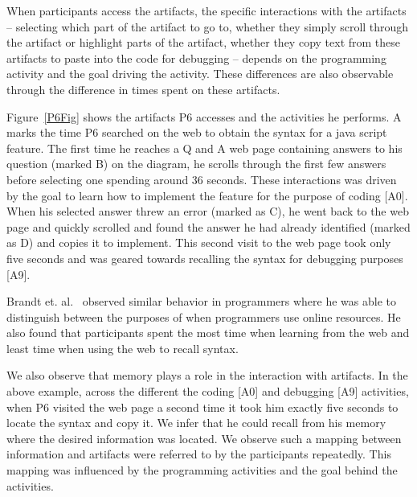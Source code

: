 When participants access the artifacts, the specific interactions with the artifacts -- selecting which part of the artifact to go to, whether they simply scroll through the artifact or highlight parts of the artifact, whether they copy text from these artifacts to paste into the code for debugging -- depends on the programming activity and the goal driving the activity. These differences are also observable through the difference in times spent on these artifacts.

Figure~\ref{P6Fig} shows the artifacts P6 accesses and the activities he performs. A marks the time P6 searched on the web to obtain the syntax for a java script feature. The first time he reaches a Q and A web page containing answers to his question (marked B) on the diagram, he scrolls through the first few answers before selecting one spending around 36 seconds. These interactions was driven by the goal to learn how to implement the feature for the purpose of coding [A0]. When his selected answer threw an error (marked as C), he went back to the web page and quickly scrolled and found the answer he had already identified (marked as D) and copies it to implement. This second visit to the web page took only five seconds and was geared towards recalling the syntax for debugging purposes [A9]. 

Brandt et. al.~\cite{Brandt:2009} observed similar behavior in programmers where he was able to distinguish between the purposes of when programmers use online resources. He also found that participants spent the most time when learning from the web and least time when using the web to recall syntax.


We also observe that memory plays a role in the interaction with artifacts. In the above example, across the different the coding [A0] and debugging [A9] activities, when P6 visited the web page a second time it took him exactly five seconds to locate the syntax and copy it. We infer that he could recall from his memory where the desired information was located. We observe such a mapping between information and artifacts were referred to by the participants repeatedly. This mapping was influenced by the programming activities and the goal behind the activities.


